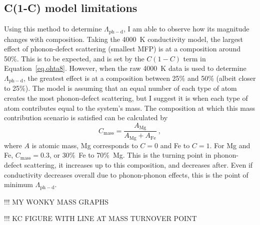 \subsection{C(1-C) model limitations}

Using this method to determine $\Lambda_{\mathrm{ph-d}}$, I am able to observe how its magnitude changes with composition. Taking the 4000~K conductivity model, the largest effect of phonon-defect scattering (smallest MFP) is at a composition around 50\%. This is to be expected, and is set by the $C \left (1-C \right)$ term in Equation~\ref{eq.ohta8}. However, when the raw 4000~K data is used to determine $\Lambda_{\mathrm{ph-d}}$, the greatest effect is at a composition between 25\% and 50\% (albeit closer to 25\%). The model is assuming that an equal number of each type of atom creates the most phonon-defect scattering, but I suggest it is when each type of atom contributes equal to the system's mass. The composition at which this mass contribution scenario is satisfied can be calculated by
%
\begin{equation}
C_{\mathrm{mass}} = \frac{A_{\mathrm{Mg}}}{A_{\mathrm{Mg}} + A_{\mathrm{Fe}}}\ ,
\label{eq:mass_turnover_point}
\end{equation}
%
where $A$ is atomic mass, Mg corresponds to $C=0$ and Fe to $C=1$. For Mg and Fe, $C_{\mathrm{mass}} = 0.3$, or 30\%~Fe to 70\%~Mg. This is the turning point in phonon-defect scattering, it increases up to this composition, and decreases after. Even if conductivity decreases overall due to phonon-phonon effects, this is the point of minimum $\Lambda_{\mathrm{ph-d}}$.

!!! MY WONKY MASS GRAPHS

!!! KC FIGURE WITH LINE AT MASS TURNOVER POINT




\pagebreak
